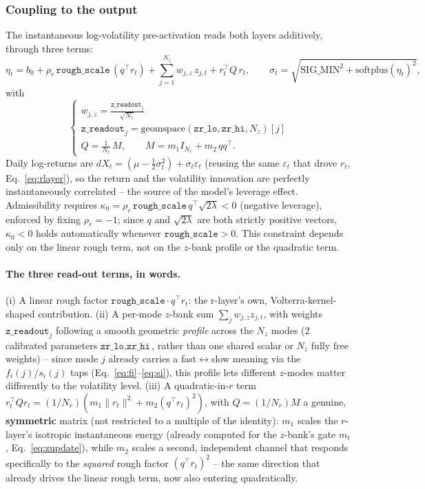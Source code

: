 \documentclass[11pt,a4paper]{article}
\begin{document}
\subsubsection{Coupling to the output}
\label{sec:coupling}

The instantaneous log-volatility pre-activation reads both layers
additively, through three terms:
\begin{equation}
  \eta_t = b_0 + \rho_r\,\texttt{rough\_scale}\,(q^\top r_t)
         + \sum_{j=1}^{N_z} w_{j,z}\,z_{j,t}
         + r_t^\top Q\,r_t,
  \qquad
  \sigma_t = \sqrt{\mathrm{SIG\_MIN}^2+\mathrm{softplus}(\eta_t)^2},
  \label{eq:coupling}
\end{equation}
with
\begin{equation}
\begin{cases}
    w_{j,z} = \frac{\texttt{z\_readout}_j}{\sqrt{N_z}}\\
    \texttt{z\_readout}_j = \mathrm{geomspace}(\texttt{zr\_lo},\texttt{zr\_hi},N_z)[j]\\
     Q = \frac{1}{N_r}\,M,\qquad M = m_1 I_{N_r} + m_2\,qq^\top.
\end{cases}
  \label{eq:profile_and_Q}
\end{equation}
Daily log-returns are $dX_t=(\mu-\tfrac12\sigma_t^2)+\sigma_t\varepsilon_t$
(reusing the same $\varepsilon_t$ that drove $r_t$, Eq.~\eqref{eq:rlayer}),
so the return and the volatility innovation are perfectly
instantaneously correlated -- the source of the model's leverage
effect. Admissibility requires
$\kappa_0=\rho_r\,\texttt{rough\_scale}\,q^\top\sqrt{2\lambda}<0$
(negative leverage), enforced by fixing $\rho_r=-1$; since $q$ and
$\sqrt{2\lambda}$ are both strictly positive vectors, $\kappa_0<0$
holds automatically whenever $\texttt{rough\_scale}>0$. This
constraint depends only on the linear rough term, not on the $z$-bank
profile or the quadratic term.

\paragraph{The three read-out terms, in words.} (i) A linear rough
factor $\texttt{rough\_scale}\cdot q^\top r_t$: the r-layer's own,
Volterra-kernel-shaped contribution. (ii) A per-mode $z$-bank sum
$\sum_j w_{j,z}z_{j,t}$, with weights $\texttt{z\_readout}_j$ following
a smooth geometric \emph{profile} across the $N_z$ modes (2 calibrated
parameters $\texttt{zr\_lo},\texttt{zr\_hi}$, rather than one shared
scalar or $N_z$ fully free weights) -- since mode $j$ already carries a
fast$\leftrightarrow$slow meaning via the $f_i(j)/s_i(j)$ taps
(Eq.~\ref{eq:fi}--\ref{eq:si}), this profile lets different $z$-modes
matter differently to the volatility level. (iii) A quadratic-in-$r$
term $r_t^\top Qr_t=(1/N_r)(m_1\|r_t\|^2+m_2(q^\top r_t)^2)$, with
$Q=(1/N_r)M$ a genuine, \textbf{symmetric} matrix (not restricted to a
multiple of the identity): $m_1$ scales the $r$-layer's isotropic
instantaneous energy (already computed for the $z$-bank's gate $m_t$,
Eq.~\ref{eq:zupdate}), while $m_2$ scales a second, independent channel
that responds specifically to the \emph{squared} rough factor
$(q^\top r_t)^2$ -- the same direction that already drives the linear
rough term, now also entering quadratically.
\end{document}
